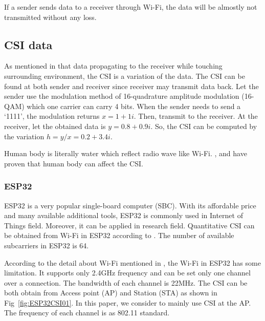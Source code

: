 \documentclass[10pt,letterpaper]{article}
\begin{document}
	If a sender sends data to a receiver through Wi-Fi, the data will be almostly not transmitted without any loss.
	
	
	
	\subsection*{CSI data}\label{CSI}
	As mentioned in  that data propagating to the receiver while touching surrounding environment, the CSI is a variation of the data. The CSI can  be found at both sender and receiver since receiver may transmit data back. Let the sender use the modulation method of 16-quadrature amplitude modulation (16-QAM) which one carrier can carry 4 bits. When the sender needs to send a `1111', the modulation returns $x=1+1i$. Then, transmit to the receiver. At the receiver, let the obtained data is $y=0.8+0.9i$. So, the CSI can be computed by the variation $h=y/x=0.2+3.4i$.
	
	Human body is literally water which reflect radio wave like Wi-Fi. \cite{wangF}, \cite{liuJ} and \cite{chowdhuryTZ} have proven that human body can affect the CSI.
	
	\subsubsection*{ESP32}\label{ESP32}
	ESP32 is a very popular single-board computer (SBC). With its affordable price and many available additional tools, ESP32 is commonly used in Internet of Things field. Moreover, it can be applied in research field. Quantitative CSI can be obtained from Wi-Fi in ESP32 according to \cite{atifM}. The number of available subcarriers in ESP32 is 64.
	
	According to the detail about Wi-Fi mentioned in , the Wi-Fi in ESP32 has some limitation. It supports only 2.4GHz frequency and can be set only one channel over a connection. The bandwidth of each channel is 22MHz. The CSI can be both obtain from Access point (AP) and Station (STA) as shown in Fig~\ref{fig:ESP32CSI01}.  In this paper, we consider to mainly use CSI at the AP.
	The frequency of each channel is as 802.11 standard.
	
	
	
\end{document}

